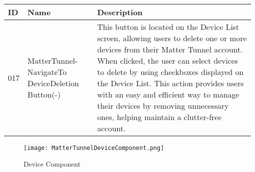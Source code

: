 \documentclass[conference]{IEEEtran}
\begin{document}
\begin{enumerate}[itemsep=2ex, parsep=1ex]
\begin{enumerate}[itemsep=2ex, parsep=1ex]
	      	      \begin{table}[h!]
	      	      	\def\arraystretch{1.24} \small
	      	      	\begin{tabular}{|p{1.2cm}|p{2.5cm}|p{4.0cm}|}
	      	      		\hline
	      	      		ID  & Name                                             & Description                                                                                                                                                                                                                                                                                                                                                                                     \\
	      	      		\hline
	      	      		017 & MatterTunnel-NavigateTo DeviceDeletion Button(-) & This button is located on the Device List screen, allowing users to delete one or more devices from their Matter Tunnel account. When clicked, the user can select devices to delete by using checkboxes displayed on the Device List. This action provides users with an easy and efficient way to manage their devices by removing unnecessary ones, helping maintain a clutter-free account. \\
	      	      		\hline
	      	      	\end{tabular}
	      	      \end{table}
	      	      	      	      
	      	      \vspace{10cm}
	      	      
	      	      \begin{figure}[h!]
	      	      	\centering
	      	      	\texttt{[image: MatterTunnelDeviceComponent.png]}
	      	      	\caption{Device Component}
	      	      	\label{fig:enter-label}
	      	      \end{figure}
	      	      	      	      

\end{enumerate}
\end{enumerate}
\end{document}
